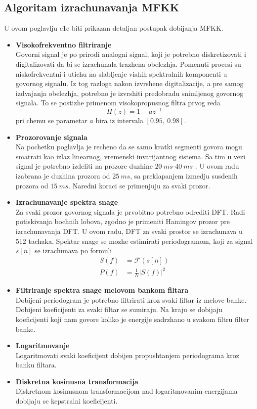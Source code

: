 \documentclass[a4paper, openany, oneside, 11pt]{book}
\begin{document}
\subsection{Algoritam izrachunavanja \acrshort{MFKK}}
U ovom poglavlju c1e biti prikazan detaljan postupak dobijanja \acrshort{MFKK}.
\begin{itemize}
\item \textbf{Visokofrekventno filtriranje}\\
Govorni signal je po prirodi analogni signal, koji je potrebno diskretizovati i digitalizovati da bi se izrachunala trazhena obelezhja. Pomenuti procesi su niskofrekventni i utichu na slabljenje vishih spektralnih komponenti u govornog signalu. Iz tog razloga nakon izvrshene digitalizacije, a pre samog izdvajanja obelezhja, potrebno je izvrshiti predobradu snimljenog govornog signala. To se postizhe primenom visokopropusnog filtra prvog reda
\begin{equation}
H(z) = 1-az^{-1}
\end{equation}
pri chemu se parametar $a$ bira iz intervala $[0.95,\ 0.98] $\cite{kepstrum}.
\item \textbf{Prozorovanje signala}\\
Na pochetku poglavlja je recheno da se samo kratki segmenti govora mogu smatrati kao izlaz linearnog, vremenski invarijantnog sistema. Sa tim u vezi signal je potrebno izdeliti na prozore duzhine $\SI{20}{ms}$-$\SI{40}{ms}$  \cite{OPGpredavanja}. U ovom radu izabrana je duzhina prozora od $\SI{25}{ms}$, sa preklapanjem izmedju susdenih prozora od $\SI{15}{ms}$. Naredni koraci se primenjuju za svaki prozor.
\item \textbf{Izrachunavanje spektra snage}\\
Za svaki prozor govornog signala je prvobitno potrebno odrediti \acrshort{DFT}. Radi potiskivanja bochnih lobova, zgodno je primeniti Hamingov prozor pre izrachunavanja \acrshort{DFT}. U ovom radu, \acrshort{DFT} za svaki prostor se izrachunava u 512 tachaka. Spektar snage se mozhe estimirati periodogramom, koji za signal $s[n]$ se izrachunava po formuli
\begin{align}
S(f) &=\boldsymbol{\mathcal{F}}(s[n])\\
P(f) &=\frac{1}{N}|S(f)|^2
\end{align}
\item \textbf{Filtriranje spektra snage melovom bankom filtara}\\
Dobijeni periodogram je potrebno filtrirati kroz svaki filtar iz melove banke. Dobijeni koeficijenti za svaki filtar se sumiraju. Na kraju se dobijaju koeficijenti koji nam govore koliko je energije sadrzhano u svakom filtru filter banke.
\item \textbf{Logaritmovanje}\\
Logaritmovati svaki koeficijent dobijen propushtanjem periodograma kroz banku filtara.
\item \textbf{Diskretna kosinusna transformacija}\\
Diskretnom kosinusnom transformacijom nad logaritmovanim energijama dobijaju se kepstralni koeficijenti.
\end{itemize}
\end{document}
